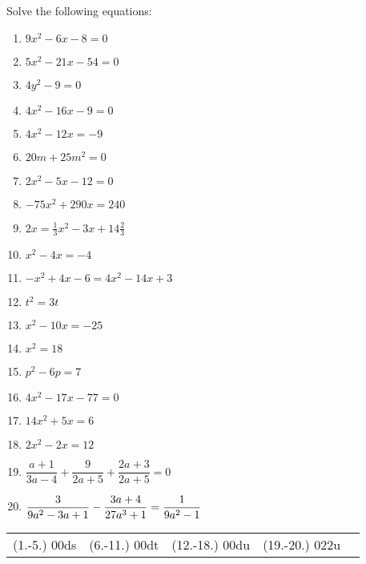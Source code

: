 \begin{exercises}{}
{Solve the following equations:
\begin{multicols}{2}
\begin{enumerate}[itemsep=5pt, label=\textbf{\arabic*}. ] 
\item  $9x^{2}-6x-8=0$%
\item  $5x^{2}-21x-54=0$%
\item  $4y^{2}-9=0$%
\item  $4x^{2}-16x-9=0$%
\item  $4x^{2}-12x=-9$%
\item  $20m+25{m}^{2}=0$
\item  $2{x}^{2}-5x-12=0$  
\item  $-75{x}^{2}+290x=240$
\item  $2x=\frac{1}{3}{x}^{2}-3x+14\frac{2}{3}$
\item  ${x}^{2}-4x=-4$      
\item  $-{x}^{2}+4x-6=4{x}^{2}-14x+3$       
\item  ${t}^{2}=3t$  
\item  ${x}^{2}-10x=-25$      
\item  ${x}^{2}=18$
\item  ${p}^{2}-6p=7$
\item  $4{x}^{2}-17x-77=0$
\item  $14{x}^{2}+5x=6$
\item  $2{x}^{2}-2x=12$  
\item  \small{$\dfrac{a+1}{3a-4}+\dfrac{9}{2a+5}+\dfrac{2a+3}{2a+5}=0$}
\item  $\dfrac{3}{9a^2-3a+1}-\dfrac{3a+4}{27a^3+1}\\[4pt]=\dfrac{1}{9a^2-1}$          
\end{enumerate}
\end{multicols}
\practiceinfo
\par 
\par\begin{tabular}[h]{ccccc}
(1.-5.) 00ds&  (6.-11.) 00dt&  (12.-18.) 00du & (19.-20.) 022u &\end{tabular}
}
\end{exercises}
